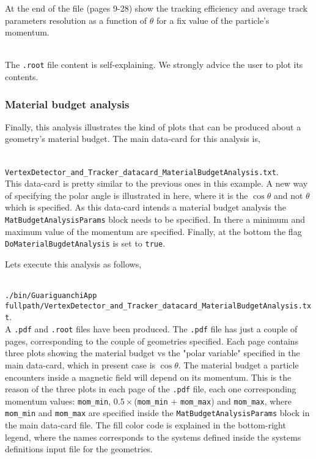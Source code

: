 At the end of the file (pages 9-28) show the tracking efficiency and average track parameters resolution as a function of $\theta$ for a fix value of the particle's momentum.

~\\
\noindent
The {\tt .root} file content is self-explaining. We strongly advice the user to plot its contents.

\subsubsection*{Material budget analysis}

Finally, this analysis illustrates the kind of plots that can be produced about a geometry's material budget. The main data-card for this analysis is,

~\\
{\small {\tt VertexDetector\_and\_Tracker\_datacard\_MaterialBudgetAnalysis.txt}}.
~\\

\noindent
This data-card is pretty similar to the previous ones in this example. A new way of specifying the polar angle is illustrated in here, where it is the $\cos\theta$ and not $\theta$ which is 
specified. As this data-card intends a material budget analysis the {\tt MatBudgetAnalysisParams} block needs to be specified. In there a minimum and maximum value of the momentum are specified. 
Finally, at the bottom the flag {\tt DoMaterialBugdetAnalysis} is set to {\tt true}.

Lets execute this analysis as follows,

~\\
{\small {\tt ./bin/GuariguanchiApp fullpath/VertexDetector\_and\_Tracker\_datacard\_MaterialBudgetAnalysis.txt}}.
~\\

\noindent
A {\tt .pdf} and {\tt .root} files have been produced. The {\tt .pdf} file has just a couple of pages, corresponding to the couple of geometries specified. Each page contains three 
plots showing the material budget vs the "polar variable" specified in the main data-card, which in present case is $\cos\theta$. The material budget a particle encounters 
inside a magnetic field will depend on its momentum. This is the reason of the three plots in each page of the {\tt .pdf} file, each one corresponding momentum values: 
{\tt mom\_min}, $0.5\times$({\tt mom\_min} $+$ {\tt mom\_max}) and {\tt mom\_max}, where {\tt mom\_min} and {\tt mom\_max} are specified inside the {\tt MatBudgetAnalysisParams} block 
in the main data-card file. The fill color code is explained in the bottom-right legend, where the names corresponds to the systems defined inside the systems definitions input file 
for the geometries.


